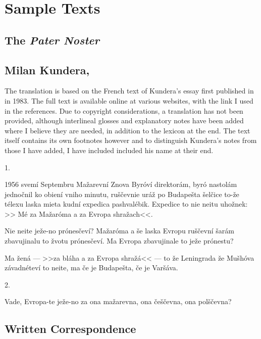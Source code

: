 \chapter{Sample Texts}

\section{The \emph{Pater Noster}}

\section{Milan Kundera, }

{\small
The translation is based on the French text of Kundera's essay  first published in  in 1983. The full text is available online at various websites, with the link I used in the references. Due to copyright considerations, a translation has not been provided, although interlineal glosses and explanatory notes have been added where  I believe they are needed, in addition to the lexicon at the end. The text itself contains its own footnotes however and to distinguish Kundera's notes from those I have added, I have included included his name at their end.
}

\begin{center}1.\end{center}

1956 svemí Septembru Mažarevní Znova Byr\'oví direktorám, byr\'o
nastolám jednočnil ko obiení vniho minutu, ruščevnie uráž
po Budapešta šelčice to-že télexu laska mieta kudní expedica
pashvalébik. Expedice to nie neitu uhožnek: >> Mé za Mažar\'oma a
za Evropa shražach<<.

Nie neite ježe-no pr\'onesčeví? Mažar\'oma a še laska Evropu ruščevní šarám zbavujinalu to žvotu pr\'onesčeví. Ma Evropa zbavujinale to ježe pr\'onestu?

Ma žená --- >>za bláha a za Evropa shražá<< --- to že Leningrada že Mušh\'ova závadnéteví to neite, ma če je Budapešta, če je Varšáva.

\begin{center}2.\end{center}
Vade, Evropa-te ježe-no za ona mažarevna, ona češčevna, ona polščevna?


\section{Written Correspondence}\label{sec:writcorr}

